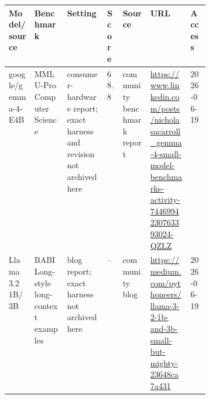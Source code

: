 \begin{tabular}{llp{0.20\linewidth}llp{0.20\linewidth}l}
\toprule
Model/source & Benchmark & Setting & Score & Source & URL & Access \\
\midrule
google/gemma-4-E4B & MMLU-Pro Computer Science & consumer-hardware report; exact harness and revision not archived here & 68.8 & community benchmark report & \url{https://www.linkedin.com/posts/nicholasacarroll_gemma-4-small-model-benchmarks-activity-7446994230763393024-QZLZ} & 2026-06-19 \\
Llama 3.2 1B/3B & BABILong-style long-context examples & blog report; exact harness not archived here & -- & community blog & \url{https://medium.com/pythoneers/llama-3-2-1b-and-3b-small-but-mighty-23648ca7a431} & 2026-06-19 \\
\bottomrule
\end{tabular}
